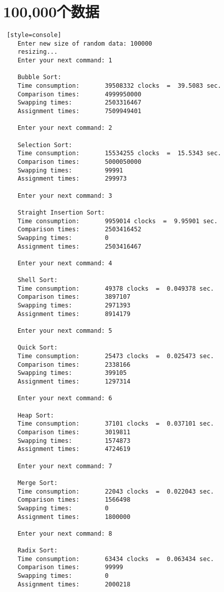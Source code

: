 \section{100,000个数据}
\begin{lstlisting} [style=console]
    Enter new size of random data: 100000
    resizing...
    Enter your next command: 1
    
    Bubble Sort:
    Time consumption:		39508332 clocks  =  39.5083 sec.
    Comparison times:		4999950000
    Swapping times:  		2503316467
    Assignment times:		7509949401
    
    Enter your next command: 2
    
    Selection Sort:
    Time consumption:		15534255 clocks  =  15.5343 sec.
    Comparison times:		5000050000
    Swapping times:  		99991
    Assignment times:		299973
    
    Enter your next command: 3
    
    Straight Insertion Sort:
    Time consumption:		9959014 clocks  =  9.95901 sec.
    Comparison times:		2503416452
    Swapping times:  		0
    Assignment times:		2503416467
    
    Enter your next command: 4
    
    Shell Sort:
    Time consumption:		49378 clocks  =  0.049378 sec.
    Comparison times:		3897107
    Swapping times:  		2971393
    Assignment times:		8914179
    
    Enter your next command: 5
    
    Quick Sort:
    Time consumption:		25473 clocks  =  0.025473 sec.
    Comparison times:		2338166
    Swapping times:  		399105
    Assignment times:		1297314
    
    Enter your next command: 6
    
    Heap Sort:
    Time consumption:		37101 clocks  =  0.037101 sec.
    Comparison times:		3019811
    Swapping times:  		1574873
    Assignment times:		4724619
    
    Enter your next command: 7
    
    Merge Sort:
    Time consumption:		22043 clocks  =  0.022043 sec.
    Comparison times:		1566498
    Swapping times:  		0
    Assignment times:		1800000
    
    Enter your next command: 8
    
    Radix Sort:
    Time consumption:		63434 clocks  =  0.063434 sec.
    Comparison times:		99999
    Swapping times:  		0
    Assignment times:		2000218
\end{lstlisting}

